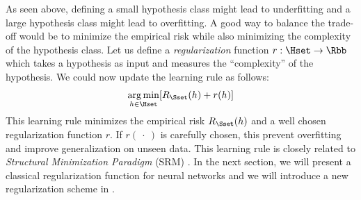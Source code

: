 As seen above, defining a small hypothesis class might lead to underfitting and a large hypothesis class might lead to overfitting.
A good way to balance the trade-off would be to minimize the empirical risk while also minimizing the complexity of the hypothesis class.
Let us define a \emph{regularization} function $r: \Hset \rightarrow \Rbb$ which takes a hypothesis as input and measures the ``complexity'' of the hypothesis.
We could now update the learning rule as follows:
\begin{equation}
  \argmin_{h \in \Hset} \left[ R_\Sset(h) + r(h) \right]
\end{equation}
This learning rule minimizes the empirical risk $R_\Sset(h)$ and a well chosen regularization function $r$. If $r(\ \cdot\ )$ is carefully chosen, this prevent overfitting and improve generalization on unseen data.
This learning rule is closely related to \emph{Structural Minimization Paradigm} (SRM) \cite{shalev2014understanding}.
In the next section, we will present a classical regularization function for neural networks and we will introduce a new regularization scheme in .













